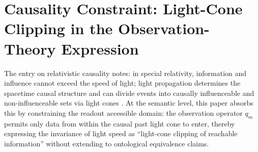 \section{Causality Constraint: Light-Cone Clipping in the Observation-Theory Expression}

The entry on relativistic causality notes: in special relativity, information and influence cannot exceed the speed of light; light propagation determines the spacetime causal structure and can divide events into causally influenceable and non-influenceable sets via light cones \cite{EinsteinOnlineCausal}.
At the semantic level, this paper absorbs this by constraining the readout accessible domain: the observation operator $q_m$ permits only data from within the causal past light cone to enter, thereby expressing the invariance of light speed as ``light-cone clipping of reachable information'' without extending to ontological equivalence claims.
